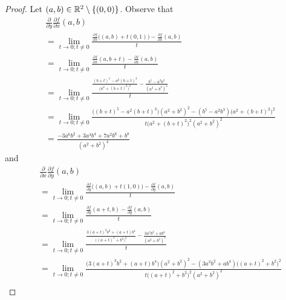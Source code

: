 \begin{proof}
  Let \((a, b) \in \mathbb{R}^2 \setminus \{(0, 0)\}\).
  Observe that
  \begin{align*}
     & \frac{\partial}{\partial y} \frac{\partial f}{\partial x}(a, b)                                                                                                                 \\
     & = \lim_{t \to 0 ; t \neq 0} \frac{\frac{\partial f}{\partial x}\big((a, b) + t(0, 1)\big) - \frac{\partial f}{\partial x}(a, b)}{t}                                             \\
     & = \lim_{t \to 0 ; t \neq 0} \frac{\frac{\partial f}{\partial x}(a, b + t) - \frac{\partial f}{\partial x}(a, b)}{t}                                                             \\
     & = \lim_{t \to 0 ; t \neq 0} \frac{\frac{(b + t)^5 - a^2 (b + t)^3}{\big(a^2 + (b + t)^2\big)^2} - \frac{b^5 - a^2 b^3}{(a^2 + b^2)^2}}{t}                                       \\
     & = \lim_{t \to 0 ; t \neq 0} \frac{\big((b + t)^5 - a^2 (b + t)^3\big) (a^2 + b^2)^2 - (b^5 - a^2 b^3) \big(a^2 + (b + t)^2\big)^2}{t \big(a^2 + (b + t)^2\big)^2 (a^2 + b^2)^2} \\
     & = \frac{-3 a^6 b^2 + 3 a^4 b^4 + 7 a^2 b^6 + b^8}{(a^2 + b^2)^4}
  \end{align*}
  and
  \begin{align*}
     & \frac{\partial}{\partial x} \frac{\partial f}{\partial y}(a, b)                                                                                                                         \\
     & = \lim_{t \to 0 ; t \neq 0} \frac{\frac{\partial f}{\partial y}\big((a, b) + t(1, 0)\big) - \frac{\partial f}{\partial y}(a, b)}{t}                                                     \\
     & = \lim_{t \to 0 ; t \neq 0} \frac{\frac{\partial f}{\partial y}(a + t, b) - \frac{\partial f}{\partial y}(a, b)}{t}                                                                     \\
     & = \lim_{t \to 0 ; t \neq 0} \frac{\frac{3 (a + t)^3 b^2 + (a + t) b^4}{\big((a + t)^2 + b^2\big)^2} - \frac{3 a^3 b^2 + a b^4}{(a^2 + b^2)^2}}{t}                                       \\
     & = \lim_{t \to 0 ; t \neq 0} \frac{\big(3 (a + t)^3 b^2 + (a + t) b^4\big) (a^2 + b^2)^2 - (3 a^3 b^2 + a b^4) \big((a + t)^2 + b^2\big)^2}{t \big((a + t)^2 + b^2\big)^2 (a^2 + b^2)^2} \\

\end{align*}
\end{proof}
